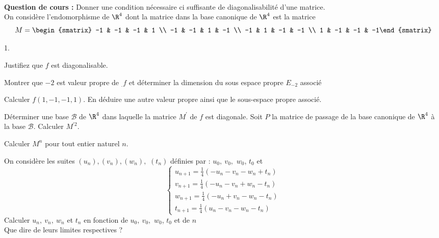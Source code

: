 \documentclass[11pt]{article}%
\begin{document}
\begin{exerciceAP}~\\
  \textbf{Question de cours :} Donner une condition nécessaire ci
  suffisante de diagonalisabilité d'une matrice.
  \\[.2cm]
  On considère l'endomorphisme de $\R^{4}$ dont la matrice dans la
  base canonique de $\R^{4}$ est la matrice 
  \begin{equation*}
    M=%
    \begin{smatrix}
      -1 & -1 & -1 & 1 \\ 
      -1 & -1 & 1 & -1 \\ 
      -1 & 1 & -1 & -1 \\ 
      1 & -1 & -1 & -1%
    \end{smatrix}%
  \end{equation*}

  \begin{noliste}{1.}
    \setlength{\itemsep}{2mm}
  \item Justifiez que $f$ est diagonalisable.

  \item Montrer que $-2$ est valeur propre de $_{.}f$ et déterminer la
    dimension du sous espace propre $E_{-2}$ associé

  \item Calculer $f\left( 1,-1,-1,1\right) $. En déduire une autre valeur
    propre ainsi que le sous-espace propre associé. 

  \item Déterminer une  base $\mathcal{B}$ de $\R^{4}$ dans
    laquelle la matrice $M^{\prime }$ de $f$ est diagonale. Soit $P$ la matrice
    de passage de la base canonique de $\R^{4}$ à la base $\mathcal{B%
    }$. Calculer $M^{\prime 2}$.

  \item Calculer $M^{n}$ pour tout entier naturel $n$.

  \item On considère les suites $\left( u_{n}\right) ,\left( v_{n}\right)
    ,\left( w_{n}\right) ,$ $\left( t_{n}\right) $ définies par : $u_{0},\
    v_{0},$ $w_{0}$, $t_{0}$ et 
    \begin{equation*}
      \left \{ 
        \begin{array}{c}
          u_{n+1}=\frac{1}{4}\left( -u_{n}-v_{n}-w_{n}+t_{n}\right)  \\ 
          v_{n+1}=\frac{1}{4}\left( -u_{n}-v_{n}+w_{n}-t_{n}\right)  \\ 
          w_{n+1}=\frac{1}{4}\left( -u_{n}+v_{n}-w_{n}-t_{n}\right)  \\ 
          t_{n+1}=\frac{1}{4}\left( u_{n}-v_{n}-w_{n}-t_{n}\right) 
        \end{array}%
      \right. 
    \end{equation*}%
    Calculer $u_{n},\ v_{n},\ w_{n}$ et  $t_{n}$ en fonction de $u_{0},\ v_{0},$ 
    $w_{0}$, $t_{0}$ et de $n$\\
    Que dire de leurs limites respectives ?
  \end{noliste}

\end{exerciceAP}
\end{document}
